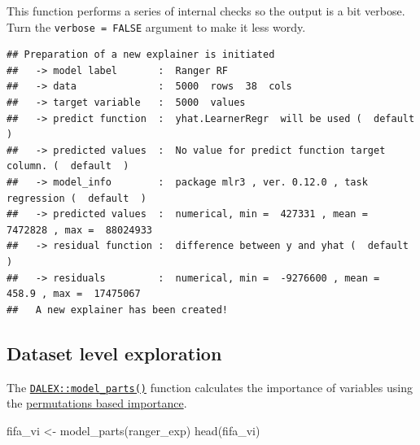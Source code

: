 \documentclass[
]{scrbook}
\newenvironment{Shaded}{\begin{snugshade}}{\end{snugshade}}
\newcommand{\AttributeTok}[1]{\textcolor[rgb]{0.77,0.63,0.00}{#1}}
\newcommand{\ConstantTok}[1]{\textcolor[rgb]{0.00,0.00,0.00}{#1}}
\newcommand{\FunctionTok}[1]{\textcolor[rgb]{0.00,0.00,0.00}{#1}}
\newcommand{\NormalTok}[1]{#1}
\newcommand{\OtherTok}[1]{\textcolor[rgb]{0.56,0.35,0.01}{#1}}
\newcommand{\SpecialCharTok}[1]{\textcolor[rgb]{0.00,0.00,0.00}{#1}}
\newcommand{\StringTok}[1]{\textcolor[rgb]{0.31,0.60,0.02}{#1}}
\renewenvironment{Shaded} {\begin{snugshade}\small} {\end{snugshade}}
\begin{document}
This function performs a series of internal checks so the output is a bit verbose. Turn the \texttt{verbose\ =\ FALSE} argument to make it less wordy.

\begin{Shaded}
\end{Shaded}

\begin{verbatim}
## Preparation of a new explainer is initiated
##   -> model label       :  Ranger RF 
##   -> data              :  5000  rows  38  cols 
##   -> target variable   :  5000  values 
##   -> predict function  :  yhat.LearnerRegr  will be used (  default  )
##   -> predicted values  :  No value for predict function target column. (  default  )
##   -> model_info        :  package mlr3 , ver. 0.12.0 , task regression (  default  ) 
##   -> predicted values  :  numerical, min =  427331 , mean =  7472828 , max =  88024933  
##   -> residual function :  difference between y and yhat (  default  )
##   -> residuals         :  numerical, min =  -9276600 , mean =  458.9 , max =  17475067  
##   A new explainer has been created!
\end{verbatim}

\hypertarget{interpretability-dataset-level}{%
\subsection{Dataset level exploration}\label{interpretability-dataset-level}}

The \href{https://www.rdocumentation.org/packages/DALEX/topics/model_parts}{\texttt{DALEX::model\_parts()}} function calculates the importance of variables using the \href{https://pbiecek.github.io/ema/featureImportance.html}{permutations based importance}.

\begin{Shaded}
\begin{Highlighting}[]
\NormalTok{fifa\_vi }\OtherTok{\textless{}{-}} \FunctionTok{model\_parts}\NormalTok{(ranger\_exp)}
\FunctionTok{head}\NormalTok{(fifa\_vi)}
\end{Highlighting}
\end{Shaded}
\end{document}
